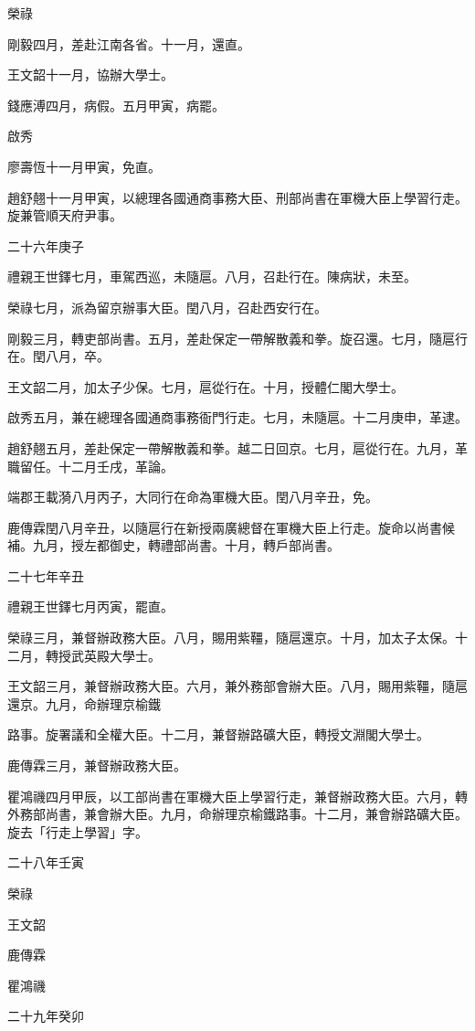 \begin{pinyinscope}
榮祿

剛毅四月，差赴江南各省。十一月，還直。

王文韶十一月，協辦大學士。

錢應溥四月，病假。五月甲寅，病罷。

啟秀

廖壽恆十一月甲寅，免直。

趙舒翹十一月甲寅，以總理各國通商事務大臣、刑部尚書在軍機大臣上學習行走。旋兼管順天府尹事。

二十六年庚子

禮親王世鐸七月，車駕西巡，未隨扈。八月，召赴行在。陳病狀，未至。

榮祿七月，派為留京辦事大臣。閏八月，召赴西安行在。

剛毅三月，轉吏部尚書。五月，差赴保定一帶解散義和拳。旋召還。七月，隨扈行在。閏八月，卒。

王文韶二月，加太子少保。七月，扈從行在。十月，授體仁閣大學士。

啟秀五月，兼在總理各國通商事務衙門行走。七月，未隨扈。十二月庚申，革逮。

趙舒翹五月，差赴保定一帶解散義和拳。越二日回京。七月，扈從行在。九月，革職留任。十二月壬戌，革論。

端郡王載漪八月丙子，大同行在命為軍機大臣。閏八月辛丑，免。

鹿傳霖閏八月辛丑，以隨扈行在新授兩廣總督在軍機大臣上行走。旋命以尚書候補。九月，授左都御史，轉禮部尚書。十月，轉戶部尚書。

二十七年辛丑

禮親王世鐸七月丙寅，罷直。

榮祿三月，兼督辦政務大臣。八月，賜用紫韁，隨扈還京。十月，加太子太保。十二月，轉授武英殿大學士。

王文韶三月，兼督辦政務大臣。六月，兼外務部會辦大臣。八月，賜用紫韁，隨扈還京。九月，命辦理京榆鐵

路事。旋署議和全權大臣。十二月，兼督辦路礦大臣，轉授文淵閣大學士。

鹿傳霖三月，兼督辦政務大臣。

瞿鴻禨四月甲辰，以工部尚書在軍機大臣上學習行走，兼督辦政務大臣。六月，轉外務部尚書，兼會辦大臣。九月，命辦理京榆鐵路事。十二月，兼會辦路礦大臣。旋去「行走上學習」字。

二十八年壬寅

榮祿

王文韶

鹿傳霖

瞿鴻禨

二十九年癸卯


\end{pinyinscope}
